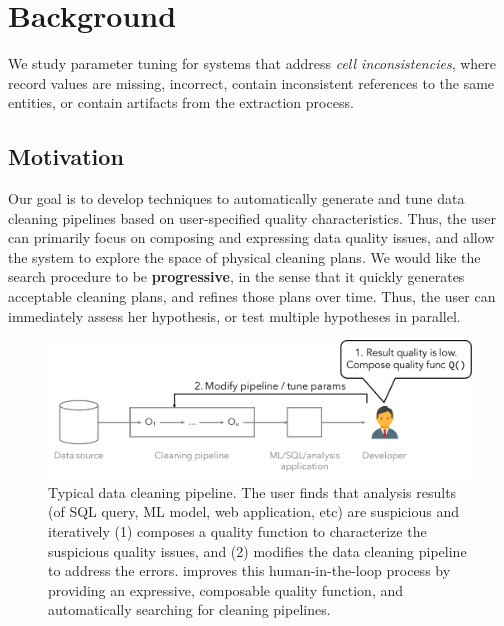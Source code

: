 \section{Background}\label{s:background}
We study parameter tuning for systems that address \emph{cell inconsistencies}, where record values are missing, incorrect, contain inconsistent references to the same entities, or contain artifacts from the extraction process. 


\subsection{Motivation}
Our goal is to develop techniques to automatically generate and tune data cleaning pipelines based on user-specified quality characteristics.  Thus, the user can primarily focus on composing and expressing data quality issues, and allow the system to explore the space of physical cleaning plans.  We would like the search procedure to be \textbf{progressive}, in the sense that it quickly generates acceptable cleaning plans, and refines those plans over time.  Thus, the user can immediately assess her hypothesis, or test multiple hypotheses in parallel.


\begin{figure}[t]
  \centering
 \includegraphics[width=\columnwidth]{figures/user-pipeline}
 \caption{\small Typical data cleaning pipeline.  The user finds that analysis results (of SQL query, ML model, web application, etc) are suspicious and iteratively (1) composes a quality function to characterize the suspicious quality issues, and (2) modifies the data cleaning pipeline to address the errors.  \sys improves this human-in-the-loop process by providing an expressive, composable quality function, and automatically searching for cleaning pipelines.  \label{fig:user-pipeline}}
\end{figure}

